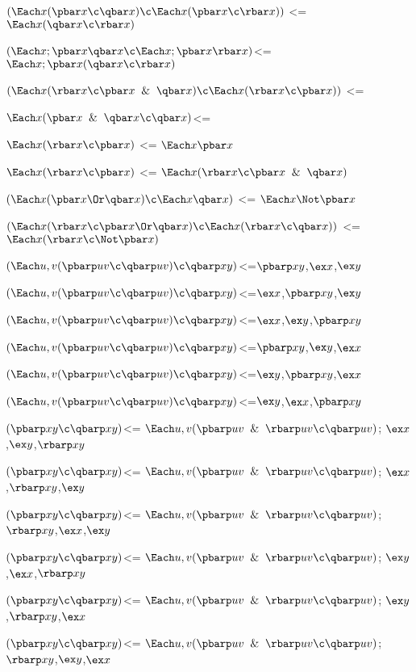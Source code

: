 $(\Each x (\pbar x \c \qbar x) \c \Each x (\pbar x \c \rbar x))$ <= $\Each x(\qbar x \c \rbar x)$

$(\Each x; \pbar x \qbar x \c\Each x;\pbar x \rbar x)$<=$\Each x;\pbar x(\qbar x\c\rbar x)$

$(\Each x (\rbar x \c \pbar x \And \qbar x)\c \Each x (\rbar x \c \pbar x))$ <=

$\Each x (\pbar x \And \qbar x \c \qbar x)$<=

$\Each x (\rbar x \c \pbar x)$ <= $\Each x \pbar x $

$\Each x (\rbar x \c \pbar x)$ <= $\Each x(\rbar x \c \pbar x \And \qbar x)$

$(\Each x (\pbar x \Or \qbar x) \c \Each x \qbar x )$ <= $\Each x \Not\pbar x $

$(\Each x (\rbar x \c \pbar x \Or \qbar x) \c \Each x (\rbar x \c \qbar x)) $ <= $\Each x (\rbar x \c \Not\pbar x )$

$(\Each u,v (\pbarp uv \c \qbarp uv) \c \qbarp xy)$<=$\pbarp xy$,$\ex x$,$\ex y$

$(\Each u,v (\pbarp uv \c \qbarp uv) \c \qbarp xy)$<=$\ex x$,$\pbarp xy$,$\ex y$

$(\Each u,v (\pbarp uv \c \qbarp uv) \c \qbarp xy)$<=$\ex x$,$\ex y$,$\pbarp xy$

$(\Each u,v (\pbarp uv \c \qbarp uv) \c \qbarp xy)$<=$\pbarp xy$,$\ex y$,$\ex x$

$(\Each u,v (\pbarp uv \c \qbarp uv) \c \qbarp xy)$<=$\ex y$,$\pbarp xy$,$\ex x$

$(\Each u,v (\pbarp uv \c \qbarp uv) \c \qbarp xy)$<=$\ex y$,$\ex x$,$\pbarp xy$

$(\pbarp xy \c \qbarp xy)$<= $\Each u,v (\pbarp uv \And \rbarp uv\c \qbarp uv)$; $\ex x$,$\ex y$,$\rbarp xy$ 

$(\pbarp xy \c \qbarp xy)$<= $\Each u,v (\pbarp uv \And \rbarp uv\c \qbarp uv)$; $\ex x$,$\rbarp xy$,$\ex y$ 

$(\pbarp xy \c \qbarp xy)$<= $\Each u,v (\pbarp uv \And \rbarp uv\c \qbarp uv)$; $\rbarp xy$,$\ex x$,$\ex y$ 

$(\pbarp xy \c \qbarp xy)$<= $\Each u,v (\pbarp uv \And \rbarp uv\c \qbarp uv)$; $\ex y$,$\ex x$,$\rbarp xy$ 

$(\pbarp xy \c \qbarp xy)$<= $\Each u,v (\pbarp uv \And \rbarp uv\c \qbarp uv)$; $\ex y$,$\rbarp xy$,$\ex x$ 

$(\pbarp xy \c \qbarp xy)$<= $\Each u,v (\pbarp uv \And \rbarp uv\c \qbarp uv)$; $\rbarp xy$,$\ex y$,$\ex x$ 

